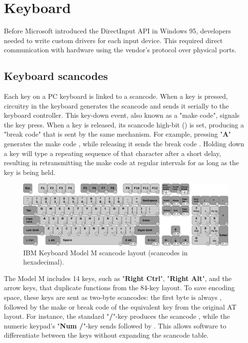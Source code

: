 \documentclass[book.tex]{subfiles}
\begin{document}
\pagebreak
\section{Keyboard}
Before Microsoft introduced the DirectInput API in Windows 95, developers needed to write custom drivers for each input device. This required direct communication with hardware using the vendor's protocol over physical ports. 


\subsection{Keyboard scancodes}
\par
Each key on a PC keyboard is linked to a scancode. When a key is pressed, circuitry in the keyboard generates the scancode and sends it serially to the keyboard controller. This key-down event, also known as a "make code", signals the key press. When a key is released, its scancode high-bit () is set, producing a "break code" that is sent by the same mechanism. For example, pressing "\textbf{A}" generates the make code , while releasing it sends the break code . Holding down a key will type a repeating sequence of that character after a short delay, resulting in retransmitting the make code at regular intervals for as long as the key is being held.\\

\begin{figure}[H]
\centering
      \includegraphics[width=1.0\textwidth]{imgs/drawings/keyboard_model_M.eps}
      \caption{IBM Keyboard Model M scancode layout (scancodes in hexadecimal).}
\end{figure}

\par
The Model M includes 14 keys, such as "\textbf{Right Ctrl}", "\textbf{Right Alt}", and the arrow keys, that duplicate functions from the 84-key layout. To save encoding space, these keys are sent as two-byte scancodes: the first byte is always , followed by the make or break code of the equivalent key from the original AT layout. For instance, the standard "\textbf{/}"-key produces the scancode , while the numeric keypad's "\textbf{Num /}"-key sends  followed by . This allows software to differentiate between the keys without expanding the scancode table.\\
\end{document}
